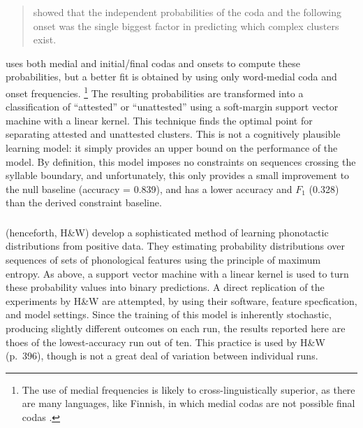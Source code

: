 \begin{quote}
\citet{Pierrehumbert1994} showed that the independent probabilities of the coda and the following onset was the single biggest factor in predicting which complex clusters exist. \citep[50]{Coleman1997}
\end{quote}

\noindent \citet{Pierrehumbert1994} uses both medial and initial/final codas and onsets to compute these probabilities, but a better fit is obtained by using only word-medial coda and onset frequencies. \footnote{The use of medial frequencies is likely to cross-linguistically superior, as there are many languages, like Finnish, in which medial codas are not possible final codas \citep[][306]{Fischer-Jorgensen1952}.} The resulting probabilities are transformed into a classification of ``attested'' or ``unattested'' using a soft-margin support vector machine \citep{Cortes1995} with a linear kernel. This technique finds the optimal point for separating attested and unattested clusters. This is not a cognitively plausible learning model: it simply provides an upper bound on the performance of the \citeauthor{Pierrehumbert1994} model. By definition, this model imposes no constraints on sequences crossing the syllable boundary, and unfortunately, this only provides a small improvement to the null baseline (accuracy = 0.839), and has a lower accuracy and $F_1$ (0.328) than the derived constraint baseline. 


\subsubsection{\citet{Hayes2008a}}

\citet{Hayes2008a} (henceforth, H\&W) develop a sophisticated method of learning phonotactic distributions from positive data. They estimating probability distributions over sequences of sets of phonological features using the principle of maximum entropy. As above, a support vector machine with a linear kernel is used to turn these probability values into binary predictions. A direct replication of the experiments by H\&W are attempted, by using their software, feature specfication, and model settings. Since the training of this model is inherently stochastic, producing slightly different outcomes on each run, the results reported here are thoes of the lowest-accuracy run out of ten. This practice is used by H\&W (p.~396), though is not a great deal of variation between individual runs.

